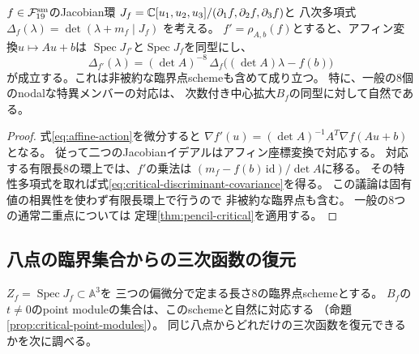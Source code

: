 \begin{proposition}[八次臨界値多項式のアフィン共変性]
\label{prop:critical-discriminant-covariance}
$f\in\mathcal F_{19}^{\rm sm}$のJacobian環
$J_f=\mathbb C[u_1,u_2,u_3]/(\partial_1f,\partial_2f,\partial_3f)$と
八次多項式$\Delta_f(\lambda)=\det(\lambda+m_f\mid J_f)$
を考える。
$f'=\rho_{A,b}(f)$とすると、アフィン変換$u\mapsto Au+b$は
$\operatorname{Spec}J_{f'}$と$\operatorname{Spec}J_f$を同型にし、
\begin{equation}\label{eq:critical-discriminant-covariance}
 \boxed{\quad
 \Delta_{f'}(\lambda)
 =(\det A)^{-8}\,
   \Delta_f\bigl((\det A)\lambda-f(b)\bigr)
 \quad}
\end{equation}
が成立する。これは非被約な臨界点schemeも含めて成り立つ。
特に、一般の8個のnodalな特異メンバーの対応は、
次数付き中心拡大$B_f$の同型に対して自然である。
\end{proposition}
\begin{proof}
式\eqref{eq:affine-action}を微分すると
$\nabla f'(u)=(\det A)^{-1}A^T\nabla f(Au+b)$となる。
従って二つのJacobianイデアルはアフィン座標変換で対応する。
対応する有限長8の環上では、$f'$の乗法は
$(m_f-f(b)\,\mathrm{id})/\det A$に移る。
その特性多項式を取れば式\eqref{eq:critical-discriminant-covariance}を得る。
この議論は固有値の相異性を使わず有限長環上で行うので
非被約な臨界点も含む。
一般の8つの通常二重点については
定理\ref{thm:pencil-critical}を適用する。
\end{proof}


\subsection{八点の臨界集合からの三次函数の復元}
\label{sec:r13-eight-reconstruction}
$Z_f=\operatorname{Spec}J_f\subset\mathbb A^3$を
三つの偏微分で定まる長さ8の臨界点schemeとする。
$B_f$の$t\ne0$のpoint moduleの集合は、このschemeと自然に対応する
（命題\ref{prop:critical-point-modules}）。
同じ八点からどれだけの三次函数を復元できるかを次に調べる。

